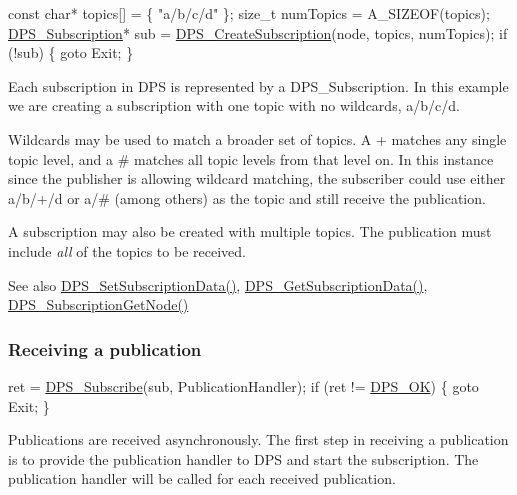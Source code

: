 \begin{DoxyCodeInclude}
    \textcolor{keyword}{const} \textcolor{keywordtype}{char}* topics[] = \{
        \textcolor{stringliteral}{"a/b/c/d"}
    \};
    \textcolor{keywordtype}{size\_t} numTopics = A\_SIZEOF(topics);
    \hyperlink{group__subscription_gadb927c4c1b7306867a75fc4288b54af7}{DPS\_Subscription}* sub = \hyperlink{group__subscription_ga4095bb00bd0ca7fa9614ebbc2c28199f}{DPS\_CreateSubscription}(node, topics, 
      numTopics);
    \textcolor{keywordflow}{if} (!sub) \{
        \textcolor{keywordflow}{goto} Exit;
    \}
\end{DoxyCodeInclude}
 Each subscription in D\+PS is represented by a {\ttfamily D\+P\+S\+\_\+\+Subscription}. In this example we are creating a subscription with one topic with no wildcards, {\ttfamily a/b/c/d}.

Wildcards may be used to match a broader set of topics. A {\ttfamily +} matches any single topic level, and a {\ttfamily \#} matches all topic levels from that level on. In this instance since the publisher is allowing wildcard matching, the subscriber could use either {\ttfamily a/b/+/d} or {\ttfamily a/\#} (among others) as the topic and still receive the publication.

A subscription may also be created with multiple topics. The publication must include {\itshape all} of the topics to be received.

\begin{DoxySeeAlso}{See also}
\hyperlink{group__subscription_gad581d341003e20c714061e44b57c2009}{D\+P\+S\+\_\+\+Set\+Subscription\+Data()}, \hyperlink{group__subscription_ga88ab2284734f099ef67bcc60997142b3}{D\+P\+S\+\_\+\+Get\+Subscription\+Data()}, \hyperlink{group__subscription_gafea65751c811555736c8c65fcb3a9480}{D\+P\+S\+\_\+\+Subscription\+Get\+Node()}
\end{DoxySeeAlso}
\hypertarget{tutorials-hello-world_receiving-a-publication}{}\subsubsection{Receiving a publication}\label{tutorials-hello-world_receiving-a-publication}

\begin{DoxyCodeInclude}
        ret = \hyperlink{group__subscription_ga83234ea82a91e07e3f5894a4dcf5267e}{DPS\_Subscribe}(sub, PublicationHandler);
        \textcolor{keywordflow}{if} (ret != \hyperlink{group__status_ga0ea3dd37bc558859ae0cb5a4f79a4bdd}{DPS\_OK}) \{
            \textcolor{keywordflow}{goto} Exit;
        \}
\end{DoxyCodeInclude}
 Publications are received asynchronously. The first step in receiving a publication is to provide the publication handler to D\+PS and start the subscription. The publication handler will be called for each received publication.

